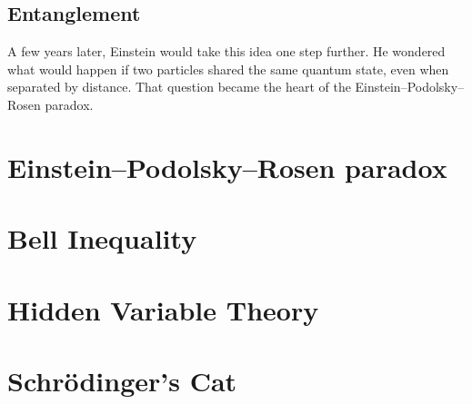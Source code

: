 \documentclass{article}
\begin{document}
\subsection{Entanglement}
A few years later, Einstein would take this idea one step further. 
He wondered what would happen if two particles shared the same quantum state, 
even when separated by distance. 
That question became the heart of the Einstein–Podolsky–Rosen paradox.


\section{Einstein–Podolsky–Rosen paradox}

\section{Bell Inequality}

\section{Hidden Variable Theory}

\section{Schrödinger's Cat}
\end{document}
